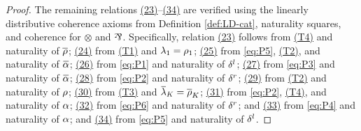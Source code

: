 \documentclass[reqno,12pt]{amsart}
\begin{document}
\begin{proof}
	The remaining relations \hyperref[Crit23]{(23)}–\hyperref[Crit34]{(34)} are verified using the linearly distributive coherence axioms from Definition \ref{def:LD-cat}, naturality squares, and coherence for $\otimes$ and $\partimes$. Specifically, relation \hyperref[Crit23]{(23)} follows from \hyperref[eq:T4]{(T4)} and naturality of ${\overline{\rho}}$; \hyperref[Crit24]{(24)} from \hyperref[eq:T1]{(T1)} and $\lambda_1=\rho_1$; \hyperref[Crit25]{(25)} from \eqref{eq:P5}, \hyperref[eq:T2]{(T2)}, and naturality of $\ap$; \hyperref[Crit26]{(26)} from \eqref{eq:P1} and naturality of $\delta^l$; \hyperref[Crit27]{(27)} from \eqref{eq:P3} and naturality of $\ap$; \hyperref[Crit28]{(28)} from \eqref{eq:P2} and naturality of $\delta^r$; \hyperref[Crit29]{(29)} from \hyperref[eq:T2]{(T2)} and naturality of $\rho$; \hyperref[Crit30]{(30)} from \hyperref[eq:T3]{(T3)} and $\lp_K=\rp_K$; \hyperref[Crit31]{(31)} from \eqref{eq:P2}, \hyperref[eq:T4]{(T4)}, and naturality of $\alpha$; \hyperref[Crit32]{(32)} from \eqref{eq:P6} and naturality of $\delta^r$; and \hyperref[Crit33]{(33)} from \eqref{eq:P4} and naturality of $\alpha$; and \hyperref[Crit34]{(34)} from \eqref{eq:P5} and naturality of $\delta^l$. 
	

\end{proof}
\end{document}
